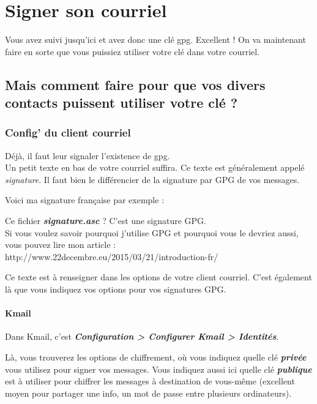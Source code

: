 \chapter{Signer son courriel}

Vous avez suivi jusqu'ici et avez donc une clé gpg. Excellent ! On va maintenant faire en sorte que vous puissiez utiliser votre clé
dans votre courriel.

\section{Mais comment faire pour que vos divers contacts puissent utiliser votre clé ?}\label{mais-comment-faire-pour-que-vos-divers-contacts-puissent-utiliser-votre-cluxe9}

\subsection{Config' du client courriel}\label{config-du-client-courriel}

Déjà, il faut leur signaler l'existence de gpg.\\Un petit texte en bas
de votre courriel suffira. Ce texte est généralement appelé
\emph{signature}. Il faut bien le différencier de la signature par GPG
de vos messages.

Voici ma signature française par exemple :

\begin{quoting}
Ce fichier \textbf{\emph{signature.asc}} ? C'est une signature GPG.\\Si
vous voulez savoir pourquoi j'utilise GPG et pourquoi vous le devriez
aussi, vous pouvez lire mon article
:\\http://www.22decembre.eu/2015/03/21/introduction-fr/
\end{quoting}

Ce texte est à renseigner dans les options de votre client courriel.
C'est également là que vous indiquez vos options pour vos signatures
GPG.

\subsubsection{Kmail}\label{kmail}

Dans Kmail, c'est \textbf{\emph{Configuration \textgreater{} Configurer
Kmail \textgreater{} Identités}}.

Là, vous trouverez les options de chiffrement, où vous indiquez quelle
clé \textbf{\emph{privée}} vous utilisez pour signer vos messages. Vous
indiquez aussi ici quelle clé \textbf{\emph{publique}} est à utiliser
pour chiffrer les messages à destination de vous-même (excellent moyen
pour partager une info, un mot de passe entre plusieurs ordinateurs).

